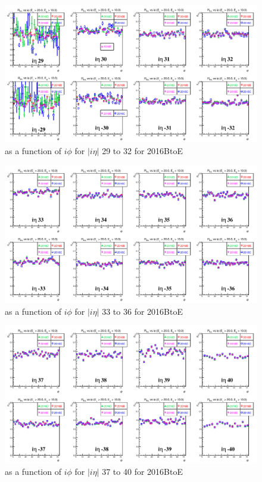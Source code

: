 \clearpage
\begin{figure}
\centering
\includegraphics[width=0.99\linewidth]{../Figures/Chap2/ImageFiles_HF/Ratio/2016/RvsIphi2016BtoE/ieta29_32_E1E2Cut0Ietaiphi}
\caption{\ratiosl as a function of $i\phi$ for $|i\eta|$ 29 to 32 for 2016BtoE}
\label{fig:ieta29_32_E1E2Cut0Ietaiphi2016BtoE}
\end{figure}
\begin{figure}
\centering
\includegraphics[width=0.99\linewidth]{../Figures/Chap2/ImageFiles_HF/Ratio/2016/RvsIphi2016BtoE/ieta33_36_E1E2Cut0Ietaiphi}
\caption{\ratiosl as a function of $i\phi$ for $|i\eta|$ 33 to 36 for 2016BtoE}
\label{fig:ieta33_36_E1E2Cut0Ietaiphi2016BtoE}
\end{figure}
\begin{figure}
\centering
\includegraphics[width=0.99\linewidth]{../Figures/Chap2/ImageFiles_HF/Ratio/2016/RvsIphi2016BtoE/ieta37_40_E1E2Cut0Ietaiphi}
\caption{\ratiosl as a function of $i\phi$ for $|i\eta|$ 37 to 40 for 2016BtoE}
\label{fig:ieta37_40_E1E2Cut0Ietaiphi2016BtoE}
\end{figure}
